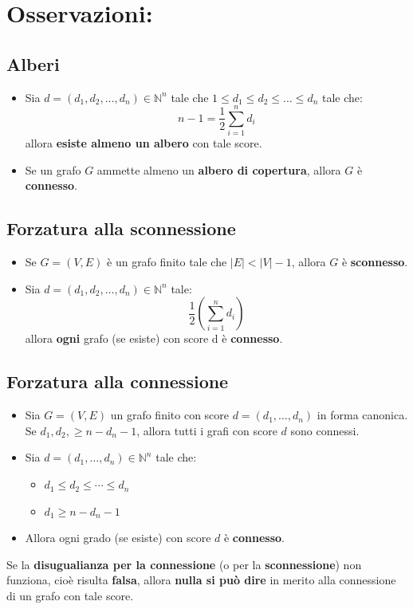 \documentclass[10pt]{article}
\begin{document}
	
	\section{Osservazioni:}
	\subsection{Alberi}
	\begin{itemize}
	\item
	Sia $d = (d_1,d_2,\dotso,d_n) \in \mathbb{N}^n$ tale che $1\leq d_1 \leq d_2 \leq \dotso \leq d_n$ tale che:$$\displaystyle{n-1 = \frac{1}{2} \sum_{i=1}^{n} d_i}$$ allora \textbf{esiste almeno un albero} con tale score.
	\item
	Se un grafo $G$ ammette almeno un \textbf{albero di copertura}, allora $G$ è \textbf{connesso}.
	\end{itemize}
	\subsection{Forzatura alla sconnessione}
	\begin{itemize}
	\item
	 Se $G=(V,E)$ è un grafo finito tale che $|E| < |V| - 1$, allora $G$ è \textbf{sconnesso}.
	 \item
	 Sia $d = (d_1, d_2, \dotso, d_n) \in \mathbb{N}^n$ tale:
	 $$\displaystyle{\frac{1}{2}\left(\sum_{i=1}^{n} d_i \right)}$$
	 allora \textbf{ogni} grafo (se esiste) con score d è \textbf{connesso}.
	\end{itemize}
	\subsection{Forzatura alla connessione}
	\begin{itemize}
	\item
	Sia $G=(V,E)$ un grafo finito con score $d=(d_1, \dotso, d_n)$ in forma canonica.\\ Se $d_1, d_2, \geq n - d_n - 1$, allora tutti i grafi con score $d$ sono connessi.
	\item
	Sia $d=(d_1, \dotso, d_n) \in \mathbb{N}^n$ tale che:
	\begin{itemize}
	\item
	$d_1 \leq d_2 \leq \dotsb \leq d_n$
	\item
	$d_1 \geq n - d_n - 1$
	\end{itemize}
	\item
	Allora ogni grado (se esiste) con score $d$ è \textbf{connesso}.
	\end{itemize}
	Se la \textbf{disugualianza per la connessione} (o per la \textbf{sconnessione}) non funziona, cioè risulta \textbf{falsa}, allora \textbf{nulla si può dire} in merito alla connessione di un grafo con tale score.
		
\end{document}
